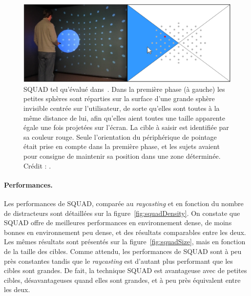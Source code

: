 	\begin{figure}[!htb]
		\centering
		\includegraphics[width=\textwidth]{figures/ch2/squad2}
		\caption[La technique SQUAD -- évaluation]{SQUAD tel qu'évalué dans~\cite{kopper2011rapid}. Dans la première phase (à gauche) les petites sphères sont réparties sur la surface d'une grande sphère invisible centrée sur l'utilisateur, de sorte qu'elles sont toutes à la même distance de lui, afin qu'elles aient toutes une taille apparente égale une fois projetées sur l'écran. La cible à saisir est identifiée par sa couleur rouge. Seule l'orientation du périphérique de pointage était prise en compte dans la première phase, et les sujets avaient pour consigne de maintenir sa position dans une zone déterminée. Crédit : \cite{kopper2011rapid}.}
		\label{fig:squad2}
	\end{figure}
	
	\paragraph{Performances.}
	Les performances de SQUAD, comparée au \emph{raycasting} et en fonction du nombre de distracteurs sont détaillées sur la figure~\ref{fig:squadDensity}. On constate que SQUAD offre de meilleures performances en environnement dense, de moins bonnes en environnement peu dense, et des résultats comparables entre les deux. Les mêmes résultats sont présentés sur la figure~\ref{fig:squadSize}, mais en fonction de la taille des cibles. Comme attendu, les performances de SQUAD sont à peu près constantes tandis que le \emph{raycasting} est d'autant plus performant que les cibles sont grandes. De fait, la technique SQUAD est avantageuse avec de petites cibles, désavantageuses quand elles sont grandes, et à peu près équivalent entre les deux.
	
